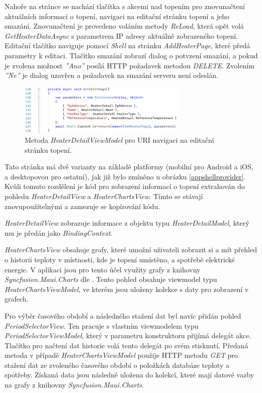 Nahoře na stránce se nachází tlačítka s akcemi nad topením pro znovunačtení aktuálních informací o topení, navigaci na editační stránku topení a jeho smazání. Znovunačtení je provedeno voláním metody {\it ReLoad}, která opět volá {\it GetHeaterDataAsync} s parametrem IP adresy aktuálně zobrazeného topení. Editační tlačítko naviguje pomocí {\it Shell} na stránku {\it AddHeaterPage}, které předá parametry k editaci. Tlačítko smazání zobrazí dialog o potvzení smazání, a pokud je zvolena možnost {\it ''Ano''} posílá HTTP požadavek metodou {\it DELETE}. Zvolením {\it ''Ne''} je dialog uzavřen a požadavek na smazání serveru není odeslán.

\begin{figure}[hbt]
\includegraphics[width=0.72\textwidth]{obrazky-figures/code-gotoedit.png}
\caption{Metoda {\it HeaterDetailViewModel} pro URI navigaci na editační stránku topení.}
\end{figure}

Tato stránka má dvě varianty na základě platformy (mobilní pro Android a iOS, a desktopovou pro ostatní), jak již bylo zmíněno u obrázku \ref{appshellprovider}. Kvůli tomuto rozdělení je kód pro zobrazení informací o topení extrahován do pohledu {\it HeaterDetailView} a {\it HeaterChartsView}. Tímto se stávají znovupoužitelnými a zamezuje se kopírování kódu.

{\it HeaterDetailView} zobrazuje informace z objektu typu {\it HeaterDetailModel}, který mu je předán jako {\it BindingContext}.

\pagebreak

{\it HeaterChartsView} obsahuje grafy, které umožní uživateli zobrazit si a mít přehled o historii teploty v místnosti, kde je topení umístěno, a spotřebě elektrické energie. V aplikaci jsou pro tento účel využity grafy z knihovny {\it Syncfusion.Maui.Charts} dle \cite{maui-charts}. Tento pohled obsahuje viewmodel typu {\it HeaterChartsViewModel}, ve kterém jsou uloženy kolekce s daty pro zobrazení v grafech.

Pro výběr časového období a následného stažení dat byl navíc přidán pohled {\it PeriodSelectorView}. Ten pracuje s vlastním viewmodelem typu {\it PeriodSelectorViewModel}, který v parametru konstruktoru přijímá delegát akce. Tlačítko pro načtení dat historie volá tento delegát po svém stisknutí. Předaná metoda v případě {\it HeaterChartsViewModel} použije HTTP metodu {\it GET} pro stažení dat ze zvoleného časového období o položkách databáze teploty a spotřeby. Získaná data jsou následně uložena do kolekcí, které mají datové vazby na grafy z knihovny {\it Syncfusion.Maui.Charts}.

